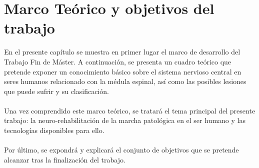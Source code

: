 \chapter{Marco Teórico y objetivos del trabajo}\label{capitulo_1}
\iffalse
\begin{chapquote}{Autor, \textit{tiempo}}
`` cita''
\end{chapquote}
\fi

En el presente capítulo se muestra en primer lugar el marco de desarrollo del Trabajo Fin de Máster. A continuación, se presenta un cuadro teórico que pretende exponer un conocimiento básico sobre el sistema nervioso central
en seres humanos relacionado con la médula espinal, así como las posibles lesiones que puede sufrir
y su clasificación. 
\\
\\
Una vez comprendido este marco teórico, se tratará el tema principal del presente trabajo: la neuro-rehabilitación
de la marcha patológica en el ser humano y las tecnologías disponibles para ello. 
\\
\\
Por último, se expondrá y explicará el conjunto de objetivos que se pretende alcanzar tras la finalización del trabajo.



